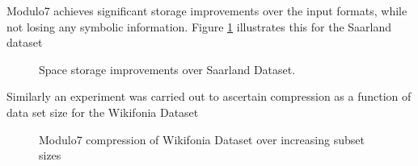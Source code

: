 \documentclass{article}
\begin{document}
Modulo7 achieves significant storage improvements over the input formats, while not losing any symbolic information. Figure \ref{fig:storageimprovement} illustrates this for the Saarland dataset \cite{saarlandmsd} \\

\begin{figure}[h]
\begin{center}
{}
 \caption{Space storage improvements over Saarland Dataset.}
 \label{fig:storageimprovement}
\end{center}
\end{figure}

\noindent Similarly an experiment was carried out to ascertain compression as a function of data set size for the Wikifonia Dataset \cite{WikifoniaDataset}

\begin{figure}[h]
\begin{center}
{}
 \caption{Modulo7 compression of Wikifonia Dataset over increasing subset sizes}
 \label{fig:compression}
\end{center}
\end{figure}
\end{document}
